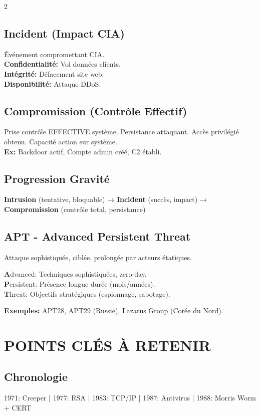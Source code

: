 \documentclass[9pt,a4paper]{extarticle}
\begin{document}
\begin{multicols}{2}
\subsection*{Incident (Impact CIA)}
Événement compromettant CIA.\\
\textbf{Confidentialité:} Vol données clients.\\
\textbf{Intégrité:} Défacement site web.\\
\textbf{Disponibilité:} Attaque DDoS.

\subsection*{Compromission (Contrôle Effectif)}
Prise contrôle EFFECTIVE système. Persistance attaquant. Accès privilégié obtenu. Capacité action sur système.\\
\textbf{Ex:} Backdoor actif, Compte admin créé, C2 établi.

\subsection*{Progression Gravité}
\textbf{Intrusion} (tentative, bloquable) → \textbf{Incident} (succès, impact) → \textbf{Compromission} (contrôle total, persistance)

\subsection*{APT - Advanced Persistent Threat}
Attaque sophistiquée, ciblée, prolongée par acteurs étatiques.

\textbf{A}dvanced: Techniques sophistiquées, zero-day.\\
\textbf{P}ersistent: Présence longue durée (mois/années).\\
\textbf{T}hreat: Objectifs stratégiques (espionnage, sabotage).

\textbf{Exemples:} APT28, APT29 (Russie), Lazarus Group (Corée du Nord).

\section*{POINTS CLÉS À RETENIR}

\subsection*{Chronologie}
1971: Creeper | 1977: RSA | 1983: TCP/IP | 1987: Antivirus | 1988: Morris Worm + CERT


\end{multicols}
\end{document}
